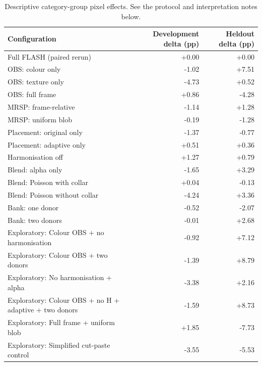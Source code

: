 \begin{table}[t]
\centering
\scriptsize
\caption{Descriptive category-group pixel effects. See the protocol and interpretation notes below.}
\begin{tabular}{lrr}
\hline
Configuration & Development delta (pp) & Heldout delta (pp) \\
\hline
Full FLASH (paired rerun) & +0.00 & +0.00 \\
OBS: colour only & -1.02 & +7.51 \\
OBS: texture only & -4.73 & +0.52 \\
OBS: full frame & +0.86 & -4.28 \\
MRSP: frame-relative & -1.14 & +1.28 \\
MRSP: uniform blob & -0.19 & -1.28 \\
Placement: original only & -1.37 & -0.77 \\
Placement: adaptive only & +0.51 & +0.36 \\
Harmonisation off & +1.27 & +0.79 \\
Blend: alpha only & -1.65 & +3.29 \\
Blend: Poisson with collar & +0.04 & -0.13 \\
Blend: Poisson without collar & -4.24 & +3.36 \\
Bank: one donor & -0.52 & -2.07 \\
Bank: two donors & -0.01 & +2.68 \\
Exploratory: Colour OBS + no harmonisation & -0.92 & +7.12 \\
Exploratory: Colour OBS + two donors & -1.39 & +8.79 \\
Exploratory: No harmonisation + alpha & -3.38 & +2.16 \\
Exploratory: Colour OBS + no H + adaptive + two donors & -1.59 & +8.73 \\
Exploratory: Full frame + uniform blob & +1.85 & -7.73 \\
Exploratory: Simplified cut-paste control & -3.55 & -5.53 \\
\hline
\end{tabular}
\end{table}

